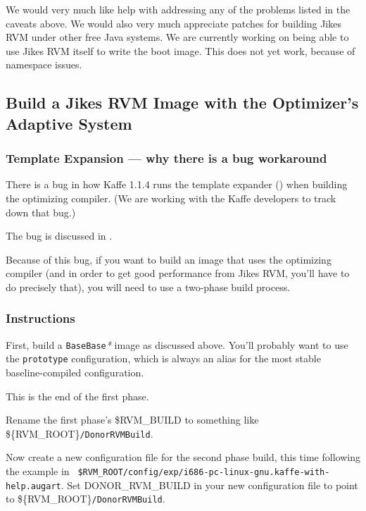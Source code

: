 We would very much like help with addressing any of the problems
listed in the caveats above.  We would also very much appreciate
patches for building Jikes RVM under other free Java systems.  We are
currently working on being able to use Jikes RVM itself to write the
boot image.  This does not yet work, because of namespace issues.

\subsection{Build a Jikes RVM Image with the Optimizer's Adaptive System}

\subsubsection{Template Expansion --- why there is a bug workaround}

  There is a bug in how Kaffe 1.1.4 runs the template expander (\gft)
  when building the \jrvm{} optimizing compiler.  (We are working with
  the Kaffe developers to track down that bug.)

  The bug is discussed in 
  .


Because of this bug, if you want to build an image that uses the
optimizing compiler (and in order to get good performance from Jikes
RVM, you'll have to do precisely that), you will need to use a
two-phase build process.

\subsubsection{Instructions}

First, build a \texttt{BaseBase}\textit{*} image as discussed above.
You'll probably want to use the \texttt{prototype} configuration,
which is always an alias for the most stable baseline-compiled
configuration.  

This is the end of the first phase.

Rename the first phase's \${RVM\_BUILD} to something like
\$\{RVM\_ROOT\}\texttt{/DonorRVMBuild}.    

Now create a new configuration file for the second phase build, this
time following the example in {\tt
\$RVM\_\-ROOT/config/exp/i686-pc-linux-gnu.kaffe-with-help.augart}.    
Set DONOR\_RVM\_BUILD in your new configuration file to point to
\$\{RVM\_ROOT\}\texttt{/DonorRVMBuild}.    

